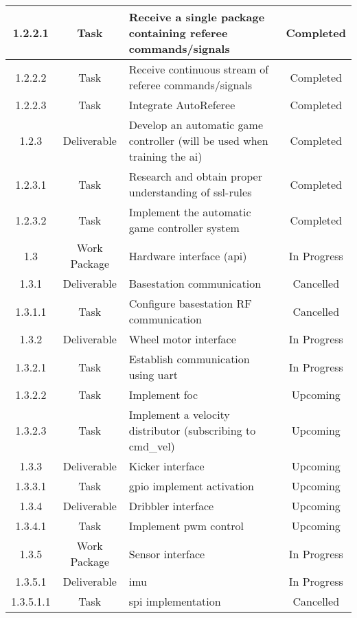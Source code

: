 \begin{longtable}{|c|c|m{}|c|}
    \rowcolor{d} 1.2.2.1 & Task & Receive a single package containing referee commands/signals & Completed \\ \hline
    \rowcolor{d} 1.2.2.2 & Task & Receive continuous stream of referee commands/signals & Completed \\ \hline
    \rowcolor{d} 1.2.2.3 & Task & Integrate AutoReferee & Completed \\ \hline
    \rowcolor{d} 1.2.3 & Deliverable & Develop an automatic game controller (will be used when training the \acs{ai}) & Completed \\ \hline
    \rowcolor{d} 1.2.3.1 & Task & Research and obtain proper understanding of \acs{ssl}-rules & Completed \\ \hline
    \rowcolor{d} 1.2.3.2 & Task & Implement the automatic game controller system & Completed \\ \hline
    \rowcolor{p} 1.3 & Work Package & Hardware interface (\acs{api}) & In Progress \\ \hline
    \rowcolor{c} 1.3.1 & Deliverable & Basestation communication & Cancelled \\ \hline
    \rowcolor{c} 1.3.1.1 & Task & Configure basestation RF communication & Cancelled \\ \hline
    \rowcolor{p} 1.3.2 & Deliverable & Wheel motor interface & In Progress \\ \hline
    \rowcolor{p} 1.3.2.1 & Task & Establish communication using \acs{uart} & In Progress \\ \hline
    \rowcolor{u} 1.3.2.2 & Task & Implement \acs{foc} & Upcoming \\ \hline
    \rowcolor{u} 1.3.2.3 & Task & Implement a velocity distributor (subscribing to cmd\_vel) & Upcoming \\ \hline
    \rowcolor{u} 1.3.3 & Deliverable & Kicker interface & Upcoming \\ \hline
    \rowcolor{u} 1.3.3.1 & Task & \acs{gpio} implement activation & Upcoming \\ \hline
    \rowcolor{u} 1.3.4 & Deliverable & Dribbler interface & Upcoming \\ \hline
    \rowcolor{u} 1.3.4.1 & Task & Implement \acs{pwm} control & Upcoming \\ \hline
    \rowcolor{p} 1.3.5 & Work Package & Sensor interface & In Progress \\ \hline
    \rowcolor{p} 1.3.5.1 & Deliverable & \acs{imu} & In Progress \\ \hline
    \rowcolor{c} 1.3.5.1.1 & Task & \acs{spi} implementation & Cancelled \\ \hline

\end{longtable}
